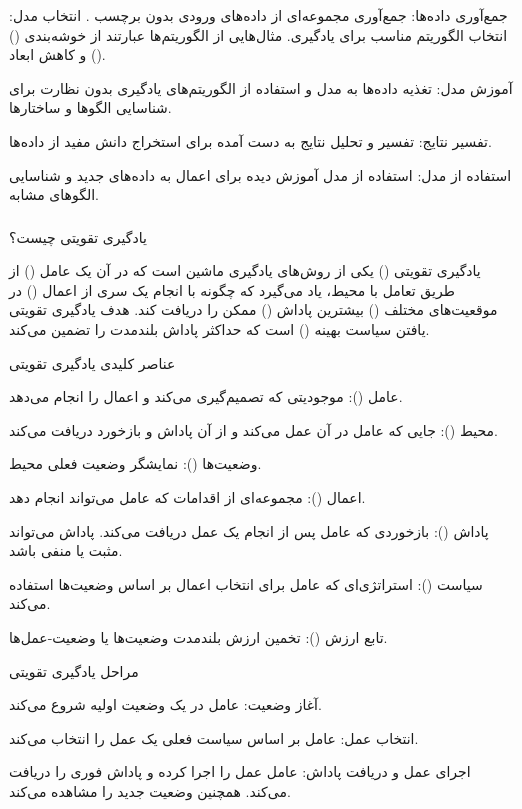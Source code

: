 \documentclass[a4paper, titlepage]{article}
\begin{document}
جمع‌آوری داده‌ها: جمع‌آوری مجموعه‌ای از داده‌های ورودی بدون برچسب
.
انتخاب مدل: انتخاب الگوریتم مناسب برای یادگیری. مثال‌هایی از الگوریتم‌ها عبارتند از خوشه‌بندی () و کاهش ابعاد ().

آموزش مدل: تغذیه داده‌ها به مدل و استفاده از الگوریتم‌های یادگیری بدون نظارت برای شناسایی الگوها و ساختارها.

تفسیر نتایج: تفسیر و تحلیل نتایج به دست آمده برای استخراج دانش مفید از داده‌ها.

استفاده از مدل: استفاده از مدل آموزش دیده برای اعمال به داده‌های جدید و شناسایی الگوهای مشابه.

\subsubsection{}

یادگیری تقویتی چیست؟

یادگیری تقویتی () یکی از روش‌های یادگیری ماشین است که در آن یک عامل () از طریق تعامل با محیط، یاد می‌گیرد که چگونه با انجام یک سری از اعمال () در موقعیت‌های مختلف () بیشترین پاداش () ممکن را دریافت کند. هدف یادگیری تقویتی یافتن سیاست بهینه () است که حداکثر پاداش بلندمدت را تضمین می‌کند.

عناصر کلیدی یادگیری تقویتی

عامل (): موجودیتی که تصمیم‌گیری می‌کند و اعمال را انجام می‌دهد.

محیط (): جایی که عامل در آن عمل می‌کند و از آن پاداش و بازخورد دریافت می‌کند.

وضعیت‌ها (): نمایشگر وضعیت فعلی محیط.

اعمال (): مجموعه‌ای از اقدامات که عامل می‌تواند انجام دهد.

پاداش (): بازخوردی که عامل پس از انجام یک عمل دریافت می‌کند. پاداش می‌تواند مثبت یا منفی باشد.

سیاست (): استراتژی‌ای که عامل برای انتخاب اعمال بر اساس وضعیت‌ها استفاده می‌کند.

تابع ارزش (): تخمین ارزش بلندمدت وضعیت‌ها یا وضعیت-عمل‌ها.

مراحل یادگیری تقویتی

آغاز وضعیت: عامل در یک وضعیت اولیه شروع می‌کند.

انتخاب عمل: عامل بر اساس سیاست فعلی یک عمل را انتخاب می‌کند.

اجرای عمل و دریافت پاداش: عامل عمل را اجرا کرده و پاداش فوری را دریافت می‌کند. همچنین وضعیت جدید را مشاهده می‌کند.
\end{document}
